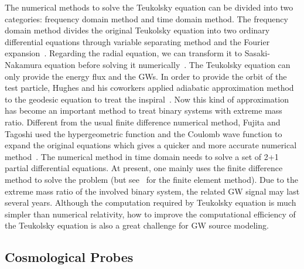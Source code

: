 \documentclass[a4paper,11pt]{article}
\begin{document}
The numerical methods to solve the Teukolsky equation can be divided into two categories: frequency domain method and time domain method. The frequency domain method divides the original Teukolsky equation into two ordinary differential equations through variable separating method and the Fourier expansion~\cite{Teukolsky:1973ha}. Regarding the radial equation, we can transform it to Sasaki-Nakamura equation before solving it numerically~\cite{Sasaki:1981sx}. The Teukolsky equation can only provide the energy flux and the GWs. In order to provide the orbit of the test particle, Hughes and his coworkers applied adiabatic approximation method to the geodesic equation to treat the inspiral~\cite{Hughes:1999bq}. Now this kind of approximation has become an important method to treat binary systems with extreme mass ratio. Different from the usual finite difference numerical method, Fujita and Tagoshi used the hypergeometric function and the Coulomb wave function to expand the original equations which gives a quicker and more accurate numerical method~\cite{Han:2016zee}. The numerical method in time domain needs to solve a set of 2+1 partial differential equations. At present, one mainly uses the finite difference method to solve the problem (but see~\cite{Sopuerta:2005gz} for the finite element method). Due to the extreme mass ratio of the involved binary system, the related GW signal may last several years. Although the computation required by Teukolsky equation is much simpler than numerical relativity, how to improve the computational efficiency of the Teukolsky equation is also a great challenge for GW source modeling.

\subsection{Cosmological Probes}
\label{subsec:cosmoprobe}
\end{document}
